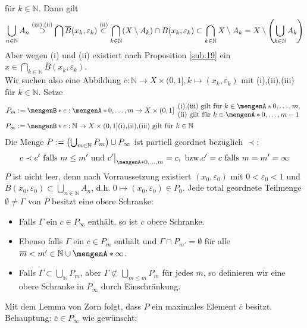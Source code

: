 für $k \in \mathds{N}$. Dann gilt 
\[
	\bigcup_{n \in \mathds{N}} A_n \stackrel{\text{(iii),(ii)}}{\supset} \bigcap \overline{B}(x_k, \varepsilon_k) \stackrel{\text{(ii)}}{\subset} 
	\bigcap_{k \in \mathds{N}}(X \setminus A_k) \cap B(x_k, \varepsilon_k) \subset \bigcap_{k \in \mathds{N}} X \setminus A_k = X \setminus 
	\enbrace*{\bigcup_{k \in \mathds{N}} A_k} 
\]
Aber wegen (i) und (ii) existiert nach Proposition \ref{sub:19} ein $x \in \bigcap_{k \in \mathds{N}}\overline{B}(x_k,\varepsilon_k)$. \light \medskip \\
Wir suchen also eine Abbildung $\overline{c} : \mathds{N} \to X \times (0,1], k  \mapsto(x_k, \varepsilon_k)$ mit (i),(ii),(iii) für $k \in \mathds{N}$. Setze
\begin{align*}
	P_m &:= \set[{c : \set{0, \ldots ,m} \to X \times (0,1] }]{\begin{array}{l}
		\text{(i),(iii) gilt für }k \in \set{0, \ldots , m}, \\
		\text{(ii) gilt für }k \in \set{0, \ldots , m-1}
	\end{array} }  \\
	P_\infty &:= \set[{c : \mathds{N} \to X \times (0,1]}]{\text{(i),(ii),(iii) gilt für } k \in \mathds{N} \rule{0cm}{0.3cm}} 
\end{align*}
Die Menge $P := \enbrace*{\bigcup_{m \in \mathds{N}} P_m} \cup P_\infty$ ist partiell geordnet bezüglich $\prec$:
\[
	c \prec c' \text{ falls } m \le m' \text{ und } c'\big|_{\set{0,\ldots ,m}} =c , \text{ bzw.} c'=c \text{ falls } m=m'=\infty
\]
$P$ ist nicht leer, denn nach Vorraussetzung existiert $(x_0,\varepsilon_0)$ mit $0 < \varepsilon_0 < 1$ und $\overline{B}(x_0, \varepsilon_0) \subset 
\bigcup_{n \in\mathds{N}} A_n$, d.h. $0 \mapsto (x_0,\varepsilon_0) \in P_0$. Jede total geordnete Teilmenge $\emptyset \not= \Gamma$ von $P$ besitzt eine obere Schranke:
\begin{itemize}
	\item Falls $\Gamma$ ein $c\in P_\infty$ enthält, so ist $c$ obere Schranke.
	\item Ebenso falls $\Gamma$ ein $c \in P_{\overline{m}}$ enthält und $\Gamma \cap P_{m'}= \emptyset$ für alle $\overline{m} < m' \in \mathds{N} \cup \set{\infty}$.
	\item Falls $\Gamma \subset \bigcup_{\mathds{N}} P_m$, aber $\Gamma \not\subset \bigcup_{m \le \overline{m}} P_m$ für jedes $\overline{m}$, so definieren wir eine
	obere Schranke in $P_\infty$ durch Einschränkung. 
\end{itemize}
Mit dem Lemma von Zorn folgt, dass $P$ ein maximales Element $\overline{c}$ besitzt. Behauptung: $\overline{c}\in P_\infty$ wie gewünscht:

